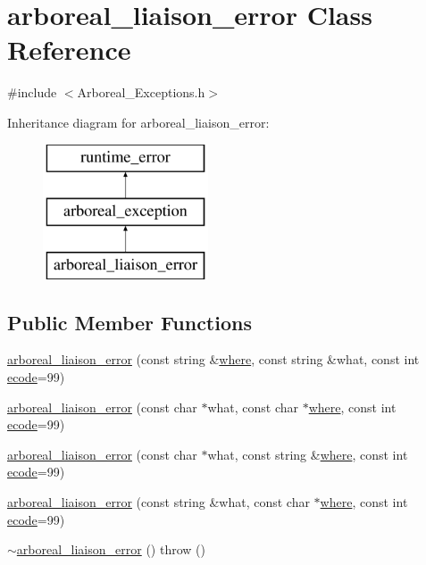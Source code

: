 \hypertarget{classarboreal__liaison__error}{}\section{arboreal\+\_\+liaison\+\_\+error Class Reference}
\label{classarboreal__liaison__error}


{\ttfamily \#include $<$Arboreal\+\_\+\+Exceptions.\+h$>$}

Inheritance diagram for arboreal\+\_\+liaison\+\_\+error\+:\begin{figure}[H]
\begin{center}
\leavevmode
\includegraphics[height=4.000000cm]{classarboreal__liaison__error}
\end{center}
\end{figure}
\subsection*{Public Member Functions}
\begin{DoxyCompactItemize}
\item 
\mbox{\hyperlink{classarboreal__liaison__error_af23c4a3672c9594e3382a05a1590abc4}{arboreal\+\_\+liaison\+\_\+error}} (const string \&\mbox{\hyperlink{classarboreal__exception_a802003dee586aaeb0b0d7ce909da2dad}{where}}, const string \&what, const int \mbox{\hyperlink{classarboreal__exception_a318e716601c544d92ff9af25edebd725}{ecode}}=99)
\item 
\mbox{\hyperlink{classarboreal__liaison__error_ae9eaf00df34e37262348e254c6dad5ff}{arboreal\+\_\+liaison\+\_\+error}} (const char $\ast$what, const char $\ast$\mbox{\hyperlink{classarboreal__exception_a802003dee586aaeb0b0d7ce909da2dad}{where}}, const int \mbox{\hyperlink{classarboreal__exception_a318e716601c544d92ff9af25edebd725}{ecode}}=99)
\item 
\mbox{\hyperlink{classarboreal__liaison__error_a593436824d649179f5c34b7311c56d2e}{arboreal\+\_\+liaison\+\_\+error}} (const char $\ast$what, const string \&\mbox{\hyperlink{classarboreal__exception_a802003dee586aaeb0b0d7ce909da2dad}{where}}, const int \mbox{\hyperlink{classarboreal__exception_a318e716601c544d92ff9af25edebd725}{ecode}}=99)
\item 
\mbox{\hyperlink{classarboreal__liaison__error_a73221c813d25af214f19eaec704ffffd}{arboreal\+\_\+liaison\+\_\+error}} (const string \&what, const char $\ast$\mbox{\hyperlink{classarboreal__exception_a802003dee586aaeb0b0d7ce909da2dad}{where}}, const int \mbox{\hyperlink{classarboreal__exception_a318e716601c544d92ff9af25edebd725}{ecode}}=99)
\item 
\mbox{\hyperlink{classarboreal__liaison__error_a5d04c823499474f4b2a206063b0ddfbb}{$\sim$arboreal\+\_\+liaison\+\_\+error}} ()  throw ()
\end{DoxyCompactItemize}

